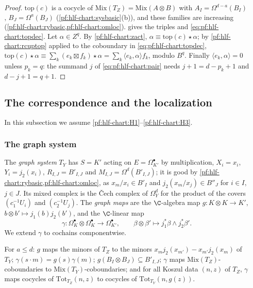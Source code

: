 \begin{proof}
$\mathrm{top}(c)$ is a cocycle of $\mathrm{Mix}(T_Z)=\mathrm{Mix}(A\otimes B)$ with $A_I=\Omega^{d-a}(B_I)$, $B_J=\Omega^a(B_J)$ (\cref{pf:hlf-chart:sysbasic}(b)),
and these families are increasing (\cref{pf:hlf-chart:rybasic,pf:hlf-chart:omloc}).  gives the triples and
\eqref{eq:pf:hlf-chart:topdec}. Let $\alpha\in Z^q$. By \cref{pf:hlf-chart:zact}, $\alpha\equiv\mathrm{top}(c)\star\alpha$; by
\cref{pf:hlf-chart:rcuptop} applied to the coboundary in \eqref{eq:pf:hlf-chart:topdec}, $\mathrm{top}(c)\star\alpha\equiv\sum_k(e_k\boxtimes f_k)\star\alpha
=\sum_k\langle e_k,\alpha\rangle f_k$, modulo $B^q$. Finally $\langle e_k,\alpha\rangle=0$ unless $p_k=q$: the summand $j$ of
\eqref{eq:pf:hlf-chart:pair} needs $j+1=d-p_k+1$ and $d-j+1=q+1$.
\end{proof}

\subsection{The correspondence and the localization}\label{pf:hlf-chart:ss:graph}

In this subsection we assume \ref{pf:hlf-chart:H1}--\ref{pf:hlf-chart:H3}.

\subsubsection*{The graph system}
The \emph{graph system} $T_Y$ has $S=K'$ acting on $E=\Omega^\bullet_{K'}$ by multiplication, $X_i=x_i$, $Y_i=j_2(x_i)$, $R_{I,J}=B'_{I,J}$ and
$M_{I,J}=\Omega^d(B'_{I,J})$; it is good by \cref{pf:hlf-chart:rybasic,pf:hlf-chart:omloc}, as $x_m/x_i\in B'_I$ and $j_2(x_m/x_j)\in B''_J$ for
$i\in I$, $j\in J$. Its mixed complex is the \v{C}ech complex of $\Omega^d_Y$ for the product of the covers $(c_1^{-1}U_i)$ and $(c_2^{-1}U_j)$. The
\emph{graph maps} are the $\C$-algebra map $g\colon K\otimes K\to K'$, $b\otimes b'\mapsto j_1(b)j_2(b')$, and the $\C$-linear map
\[
  \gamma\colon\Omega^\bullet_K\otimes\Omega^\bullet_K\to\Omega^\bullet_{K'},\qquad\beta\otimes\beta'\mapsto j_1^*\beta\wedge j_2^*\beta'.
\]
We extend $\gamma$ to cochains componentwise.

\begin{lemma}\label{pf:hlf-chart:gmap}
For $a\le d$: $g$ maps the minors of $T_Z$ to the minors $x_mj_2(x_{m'})-x_{m'}j_2(x_m)$ of $T_Y$; $\gamma(s\cdot m)=g(s)\gamma(m)$;
$g(B_I\otimes B_J)\subseteq B'_{I,J}$; $\gamma$ maps $\mathrm{Mix}(T_Z)$-coboundaries to $\mathrm{Mix}(T_Y)$-coboundaries; and for all Koszul data $(n,z)$ of
$T_Z$, $\gamma$ maps cocycles of $\mathrm{Tot}_{T_Z}(n,z)$ to cocycles of $\mathrm{Tot}_{T_Y}(n,g(z))$.
\end{lemma}

